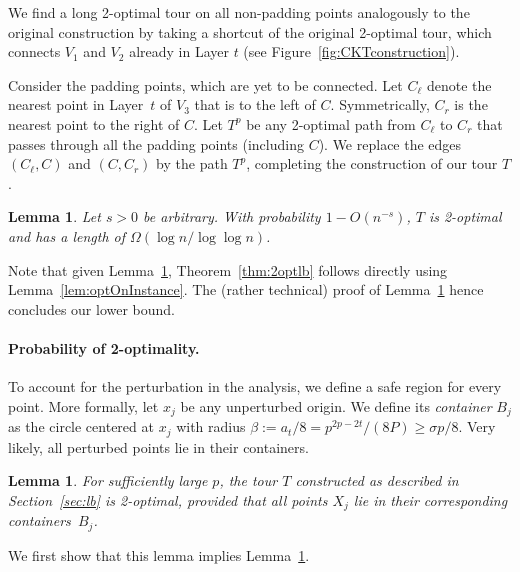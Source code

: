 \documentclass[11pt,DIV=12,a4paper]{scrartcl}
\newtheorem{lemma}[claim]{Lemma}
\newcommand{\lemref}[1]{Lemma~\ref{lem:#1}}
\newcommand{\thmref}[1]{Theorem~\ref{thm:#1}}
\begin{document}
We find a long 2-optimal tour on all non-padding points analogously to the original construction by taking a shortcut of the original 2-optimal tour, which connects $V_1$ and $V_2$ already in Layer $t$ (see Figure~\ref{fig:CKTconstruction}). 

Consider the padding points, which are yet to be connected. Let $C_\ell$ denote the nearest point in Layer~$t$ of $V_3$ that is to the left of $C$. Symmetrically, $C_r$ is the nearest point to the right of $C$. Let $T^p$ be any 2-optimal path from $C_\ell$ to $C_r$ that passes through all the padding points (including $C$). We replace the edges $(C_\ell, C)$ and $(C,C_r)$ by the path $T^p$, completing the construction of our tour $T$.

\begin{lemma}\label{lem:prob2opt}
Let $s>0$ be arbitrary. With probability $1-O(n^{-s})$, $T$ is 2-optimal and has a length of $\Omega(\log n / \log \log n)$.%
\end{lemma}

Note that given \lemref{prob2opt}, \thmref{2optlb} follows directly using \lemref{optOnInstance}. The (rather technical) proof of \lemref{prob2opt} hence concludes our lower bound.

\paragraph{Probability of 2-optimality.}

To account for the perturbation in the analysis, we define a safe region for every point. More formally, let $x_j$ be any unperturbed origin. We define its \emph{container} $B_j$ as the circle centered at $x_j$ with radius $\beta := a_t/8 = p^{2p-2t}/(8P) \ge \sigma p/8$. Very likely, all perturbed points lie in their containers.

\begin{lemma}
\label{lem:Tis2opt}
For sufficiently large $p$, the tour $T$ constructed as described in Section~\ref{sec:lb} is 2-optimal, provided that all points $X_j$ lie in their corresponding containers~$B_j$.
\end{lemma}

We first show that this lemma implies Lemma~\ref{lem:prob2opt}.
\end{document}
